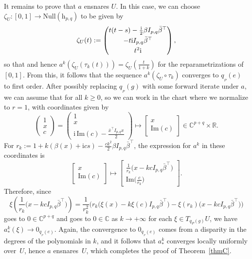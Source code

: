 \documentclass[pdftex]{sigma}
\numberwithin{equation}{section}
\theoremstyle{definition}
\begin{document}
It remains to prove that $a$ ensnares $U$. In this case, we can choose $\zeta_U\colon [0,1]\to\mathrm{Null}(\mathrm{h}_{p,q})$ to be given by
\[\zeta_U(t):=\begin{pmatrix}t(t-s)-\tfrac{\mathrm{i}}{2}\beta I_{p,q}\bar{\beta}^\top \vspace{1mm}\\ -t\mathrm{i}I_{p,q}\bar{\beta}^\top \vspace{1mm}\\ t^2\mathrm{i}\end{pmatrix},\]
so that  and hence $a^k(\zeta_U(\tau_k(t)))=\zeta_U(\tfrac{t}{1+k})$ for the reparametrizations  of $[0,1]$. From this, it follows that the sequence $a^k(\zeta_U\circ\tau_k)$ converges to $q_{{}_P}(e)$ to first order. After possibly replacing $q_{{}_P}(g)$ with some forward iterate under $a$, we can assume that  for all $k\geq 0$, so we can work in the chart where we normalize to $r=1$, with coordinates given by \[\begin{pmatrix}1 \\ x \\ c\end{pmatrix}=\begin{pmatrix}1 \\ x \\ \mathrm{i}\,\mathrm{Im}(c)-\tfrac{\bar{x}^\top I_{p,q}x}{2}\end{pmatrix}\mapsto\begin{bmatrix}x \\ \mathrm{Im}(c)\end{bmatrix}\in\mathbb{C}^{p+q}\times\mathbb{R}.\]
For $r_k:=1+k(\beta(x)+\mathrm{i}cs)-\tfrac{ck^2}{2}\beta I_{p,q}\bar{\beta}^\top$, the expression for $a^k$ in these coordinates is \[\begin{bmatrix}x \\ \mathrm{Im}(c)\end{bmatrix}\mapsto\begin{bmatrix}\tfrac{1}{r_k}\bigl(x-kcI_{p,q}\bar{\beta}^\top\bigr) \\ \mathrm{Im}\bigl(\tfrac{c}{r_k}\bigr)\end{bmatrix}.\] Therefore, since
\[\xi\left(\frac{1}{r_k}\bigl(x-kcI_{p,q}\bar{\beta}^\top\bigr)\right)
=\frac{1}{r_k^2}\bigl(r_k\bigl(\xi(x)-k\xi(c)I_{p,q}\bar{\beta}^\top\bigr) -\xi(r_k)\bigl(x-kcI_{p,q}\bar{\beta}^\top\bigr)\bigr)\] goes to $0\in\mathbb{C}^{p+q}$ and  goes to $0\in\mathbb{C}$ as $k\rightarrow+\infty$ for each $\xi\in T_{q_P(g)}U$, we have $a^k_*(\xi)\rightarrow 0_{q_{{}_P}(e)}$. Again, the convergence to $0_{q_{{}_P}(e)}$ comes from a disparity in the degrees of the polynomials in $k$, and it follows that $a^k_*$ converges locally uniformly over~$U$, hence $a$ ensnares~$U$, which completes the proof of Theorem~\ref{thmC}.
\end{document}
